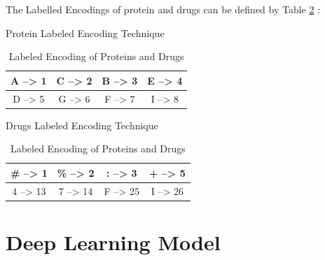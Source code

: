   The Labelled Encodings of protein and drugs can be defined by Table \ref{table:label_encoding} :
  \begin{table}[h]
    \centering
    \begin{subtable}{Protein Labeled Encoding Technique}
      \centering
      \begin{tabular}{|cccc|}
        \hline
        A --> 1 & C --> 2 & B --> 3 & E --> 4 \\ \hline
        D --> 5 & G --> 6 & F --> 7 & I --> 8 \\ \hline
      \end{tabular}
    \end{subtable}  

    \begin{subtable}{Drugs Labeled Encoding Technique}
      \centering
      \begin{tabular}{|cccc|}
        \hline
        \# --> 1 & \% --> 2 & : --> 3 & + --> 5 \\ \hline
        4 --> 13 & 7 --> 14 & F --> 25 & I --> 26 \\ \hline
      \end{tabular}
    \end{subtable}
    \caption{Labeled Encoding of Proteins and Drugs}
    \label{table:label_encoding}
  \end{table}
  

  
  \section{Deep Learning Model}
  
